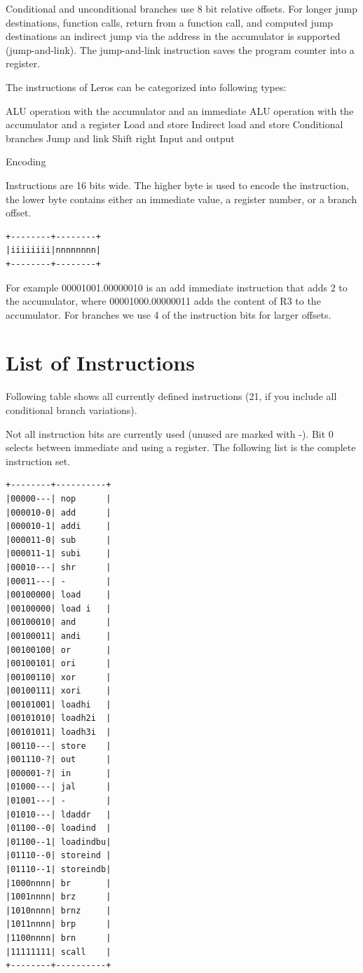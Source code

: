 \documentclass[a4paper,fontsize=10pt,twoside,DIV15,BCOR12mm,headinclude=true,footinclude=false,pagesize,bibtotoc]{scrbook}
\begin{document}
Conditional and unconditional branches use 8 bit relative offsets.
For longer jump destinations, function calls, return from a function call, and computed jump
destinations an indirect jump via the address in the accumulator is supported (jump-and-link).
The jump-and-link instruction saves the program counter into a register.


The instructions of Leros can be categorized into following types:

    ALU operation with the accumulator and an immediate
    ALU operation with the accumulator and a register
    Load and store
    Indirect load and store
    Conditional branches
    Jump and link
    Shift right
    Input and output

Encoding

Instructions are 16 bits wide. The higher byte is used to encode the instruction, the lower byte contains either an immediate value, a register number, or a branch offset.

\begin{verbatim}
+--------+--------+
|iiiiiiii|nnnnnnnn|
+--------+--------+
\end{verbatim}



For example 00001001.00000010 is an add immediate instruction that adds 2 to the accumulator, where 00001000.00000011 adds the content of R3 to the accumulator. For branches we use 4 of the instruction bits
for larger offsets.

\section{List of Instructions}

Following table shows all currently defined instructions (21, if you include all conditional branch variations).

Not all instruction bits are currently used (unused are marked with -). Bit 0 selects between immediate and using a register. The following list is the complete instruction set.

\begin{verbatim}
+--------+----------+
|00000---| nop      |
|000010-0| add      |
|000010-1| addi     |
|000011-0| sub      |
|000011-1| subi     |
|00010---| shr      |
|00011---| -        |
|00100000| load     |
|00100000| load i   |
|00100010| and      |
|00100011| andi     |
|00100100| or       |
|00100101| ori      |
|00100110| xor      |
|00100111| xori     |
|00101001| loadhi   |
|00101010| loadh2i  |
|00101011| loadh3i  |
|00110---| store    |
|001110-?| out      |
|000001-?| in       |
|01000---| jal      |
|01001---| -        |
|01010---| ldaddr   |
|01100--0| loadind  |
|01100--1| loadindbu|
|01110--0| storeind |
|01110--1| storeindb|
|1000nnnn| br       |
|1001nnnn| brz      |
|1010nnnn| brnz     |
|1011nnnn| brp      |
|1100nnnn| brn      |
|11111111| scall    |
+--------+----------+
\end{verbatim}
\end{document}
